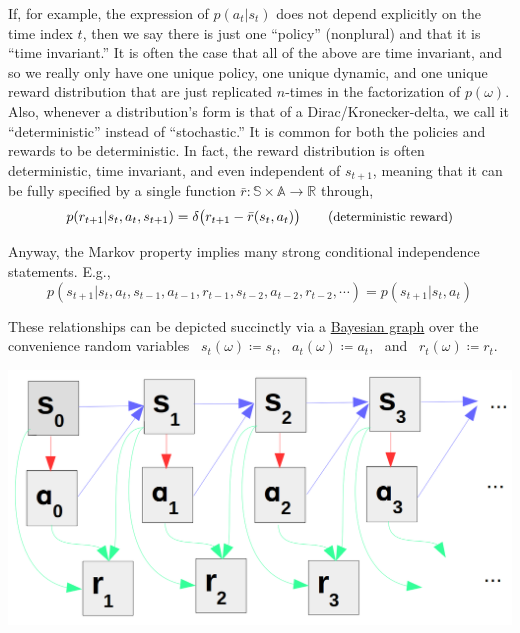 If, for example, the expression of $p(a_t|s_t)$ does not depend explicitly on the time index $t$, then we say there is just one ``policy'' (nonplural) and that it is ``time invariant.'' It is often the case that all of the above are time invariant, and so we really only have one unique policy, one unique dynamic, and one unique reward distribution that are just replicated $n$-times in the factorization of $p(\omega)$.\\

Also, whenever a distribution's form is that of a Dirac/Kronecker-delta, we call it ``deterministic'' instead of ``stochastic.'' It is common for both the policies and rewards to be deterministic. In fact, the reward distribution is often deterministic, time invariant, and even independent of $s_{t+1}$, meaning that it can be fully specified by a single function $\bar{r}:\mathbb{S}\times\mathbb{A} \to \mathbb{R}$ through,
\begin{equation*}
p(r_{t+1}|s_t,a_t,s_{t+1}) = \delta\big{(}r_{t+1} - \bar{r}(s_t, a_t)\big{)} \tag{\small{deterministic reward}}
\end{equation*}

Anyway, the Markov property implies many strong conditional independence statements. E.g.,
\begin{equation*}
p(s_{t+1}|s_t,a_t,s_{t-1},a_{t-1},r_{t-1},s_{t-2},a_{t-2},r_{t-2},\cdots) = p(s_{t+1}|s_t,a_t)
\end{equation*}

These relationships can be depicted succinctly via a \href{https://en.wikipedia.org/wiki/Bayesian_network}{Bayesian graph} over the convenience random variables \ ${s_t}(\omega) \coloneqq s_t$, \ ${a_t}(\omega) \coloneqq a_t$, \ and \ ${r_t}(\omega) \coloneqq r_t$.
\begin{center}
  \includegraphics[width=\linewidth-1.5in]{include/bayesian_graph.png}
\end{center}

